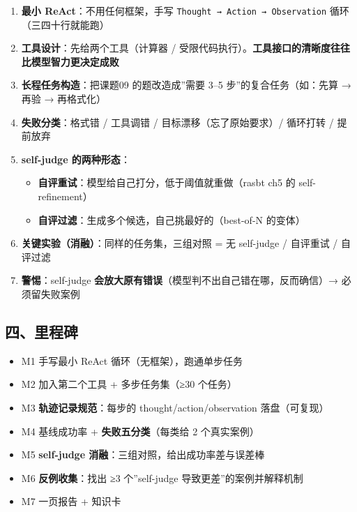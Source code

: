 \documentclass[
  chinese,
  11pt,
]{ctexart}
\providecommand{\tightlist}{%
  \setlength{\itemsep}{0pt}\setlength{\parskip}{0pt}}
\begin{document}
\begin{enumerate}
\def\labelenumi{\arabic{enumi}.}
\tightlist
\item
  \textbf{最小 ReAct}：不用任何框架，手写 \texttt{Thought\ →\ Action\ →\ Observation} 循环（三四十行就能跑）
\item
  \textbf{工具设计}：先给两个工具（计算器 / 受限代码执行）。\textbf{工具接口的清晰度往往比模型智力更决定成败}
\item
  \textbf{长程任务构造}：把课题09 的题改造成''需要 3--5 步''的复合任务（如：先算 → 再验 → 再格式化）
\item
  \textbf{失败分类}：格式错 / 工具调错 / 目标漂移（忘了原始要求）/ 循环打转 / 提前放弃
\item
  \textbf{self-judge 的两种形态}：

  \begin{itemize}
  \tightlist
  \item
    \textbf{自评重试}：模型给自己打分，低于阈值就重做（rasbt ch5 的 self-refinement）
  \item
    \textbf{自评过滤}：生成多个候选，自己挑最好的（best-of-N 的变体）
  \end{itemize}
\item
  \textbf{关键实验（消融）}：同样的任务集，三组对照 = 无 self-judge / 自评重试 / 自评过滤
\item
  \textbf{警惕}：self-judge \textbf{会放大原有错误}（模型判不出自己错在哪，反而确信）→ 必须留失败案例
\end{enumerate}

\subsection{四、里程碑}\label{ux56dbux91ccux7a0bux7891}

\begin{itemize}
\tightlist
\item[$\square$]
  M1 手写最小 ReAct 循环（无框架），跑通单步任务
\item[$\square$]
  M2 加入第二个工具 + 多步任务集（≥30 个任务）
\item[$\square$]
  M3 \textbf{轨迹记录规范}：每步的 thought/action/observation 落盘（可复现）
\item[$\square$]
  M4 基线成功率 + \textbf{失败五分类}（每类给 2 个真实案例）
\item[$\square$]
  M5 \textbf{self-judge 消融}：三组对照，给出成功率差与误差棒
\item[$\square$]
  M6 \textbf{反例收集}：找出 ≥3 个''self-judge 导致更差''的案例并解释机制
\item[$\square$]
  M7 一页报告 + 知识卡
\end{itemize}
\end{document}
